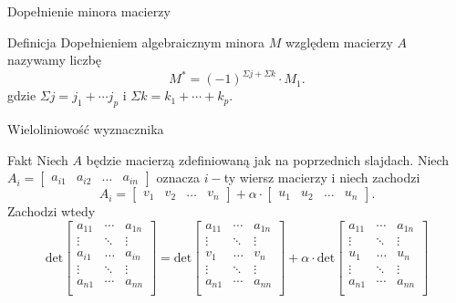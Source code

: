 \documentclass{beamer}
\renewcommand{\det}{\textrm{det}}
\begin{document}
\begin{frame}{Dopełnienie minora macierzy}
    \begin{block}{Definicja}
        \alert{Dopełnieniem algebraicznym minora $M$} względem macierzy $A$ nazywamy liczbę 
        $$ M^* = (-1)^{\Sigma j + \Sigma k} \cdot M_1.$$
    gdzie $\Sigma j = j_1 + \cdots j_p $ i $\Sigma k = k_1 + \cdots + k_p$.
    \end{block}    
\end{frame}

\begin{frame}{Wieloliniowość wyznacznika}
    \begin{alertblock}{Fakt}
        Niech $A$ będzie macierzą zdefiniowaną jak na poprzednich slajdach. 
        Niech $A_i = \begin{bmatrix}
            a_{i1} & a_{i2} & \ldots & a_{in}
        \end{bmatrix}$ oznacza $i-$ty wiersz macierzy i niech zachodzi 
        $$A_{i} = \begin{bmatrix}
            v_1 & v_2 &\ldots & v_n 
        \end{bmatrix} + \alpha \cdot \begin{bmatrix}
            u_1 & u_2 & \ldots & u_n 
        \end{bmatrix}.$$
        Zachodzi wtedy 
        $$\det \begin{bmatrix}
            a_{11} & \cdots  & a_{1n} \\ 
            \vdots & \ddots & \vdots \\
            a_{i1} & \ldots & a_{in} \\  
            \vdots & \ddots & \vdots \\ 
            a_{n1} & \cdots & a_{nn} \\
        \end{bmatrix}  = 
        \det \begin{bmatrix}
            a_{11} & \cdots  & a_{1n} \\ 
            \vdots & \ddots & \vdots \\
            v_{1} & \ldots & v_{n} \\  
            \vdots & \ddots & \vdots \\ 
            a_{n1} & \cdots & a_{nn} \\
        \end{bmatrix} + \alpha \cdot 
        \det \begin{bmatrix}
            a_{11} & \cdots  & a_{1n} \\ 
            \vdots & \ddots & \vdots \\
            u_{1} & \ldots & u_{n} \\  
            \vdots & \ddots & \vdots \\ 
            a_{n1} & \cdots & a_{nn} \\
        \end{bmatrix}
        $$
    \end{alertblock}
\end{frame}
\end{document}
